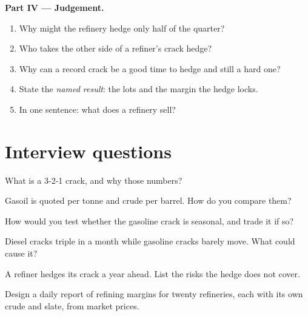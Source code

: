 \begin{problem}
\medskip\noindent\textbf{Part IV --- Judgement.}
\begin{enumerate}[resume]
\item Why might the refinery hedge only half of the quarter?
\item Who takes the other side of a refiner's crack hedge?
\item Why can a record crack be a good time to hedge and still a hard one?
\item State the \emph{named result}: the lots and the margin the hedge locks.
\item In one sentence: what does a refinery sell?
\end{enumerate}
\end{problem}

\section{Interview questions}

\begin{interviewq}\label{iq:m3:refined-products-and-cracks:1}
What is a 3-2-1 crack, and why those numbers?
\end{interviewq}

\begin{interviewq}\label{iq:m3:refined-products-and-cracks:2}
Gasoil is quoted per tonne and crude per barrel. How do you compare them?
\end{interviewq}

\begin{interviewq}\label{iq:m3:refined-products-and-cracks:3}
How would you test whether the gasoline crack is seasonal, and trade it if so?
\end{interviewq}

\begin{interviewq}\label{iq:m3:refined-products-and-cracks:4}
Diesel cracks triple in a month while gasoline cracks barely move. What could cause it?
\end{interviewq}

\begin{interviewq}\label{iq:m3:refined-products-and-cracks:5}
A refiner hedges its crack a year ahead. List the risks the hedge does not cover.
\end{interviewq}

\begin{interviewq}\label{iq:m3:refined-products-and-cracks:6}
Design a daily report of refining margins for twenty refineries, each with its own crude
and slate, from market prices.
\end{interviewq}
